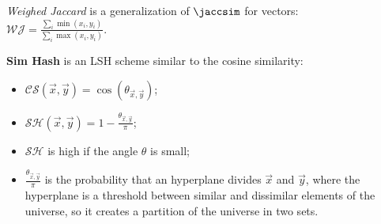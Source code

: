 \begin{example}
    \emph{Weighed Jaccard} is a generalization of $\jaccsim$ for vectors: \\ $\mathcal{WJ}=\frac
    {\sum_i \min(x_i, y_i)}{\sum_i \max(x_i, y_i)}$.
\end{example}

\begin{example}
    \textbf{Sim Hash} is an LSH scheme similar to the cosine similarity:
    \begin{itemize}
        \item $\mathcal{CS}(\vec{x},\vec{y})=
            \cos(\theta_{\vec{x},\vec{y}}) $;
        \item $\mathcal{SH}(\vec{x},\vec{y})=
            1-\frac{\theta_{\vec{x},\vec{y}}}{\pi} $;
        \item $\mathcal{SH}$ is high if the angle $\theta$ is small;
        \item $\frac{\theta_{\vec{x},\vec{y}}}{\pi}$ is the probability that an hyperplane divides $\vec{x}$ and $\vec{y}$, where the hyperplane is a threshold between similar and dissimilar elements of the universe, so it creates a partition of the universe in two sets.
    \end{itemize}
\end{example}

